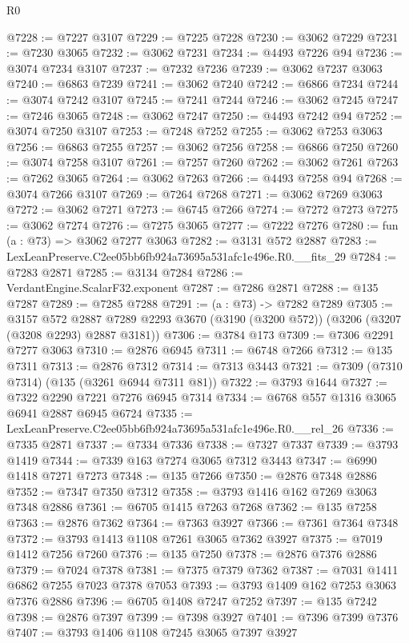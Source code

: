 \begin{lexlean}{R0}
\begin{coremodule}
@7228 := @7227 @3107
@7229 := @7225 @7228
@7230 := @3062 @7229
@7231 := @7230 @3065
@7232 := @3062 @7231
@7234 := @4493 @7226 @94
@7236 := @3074 @7234 @3107
@7237 := @7232 @7236
@7239 := @3062 @7237 @3063
@7240 := @6863 @7239
@7241 := @3062 @7240
@7242 := @6866 @7234
@7244 := @3074 @7242 @3107
@7245 := @7241 @7244
@7246 := @3062 @7245
@7247 := @7246 @3065
@7248 := @3062 @7247
@7250 := @4493 @7242 @94
@7252 := @3074 @7250 @3107
@7253 := @7248 @7252
@7255 := @3062 @7253 @3063
@7256 := @6863 @7255
@7257 := @3062 @7256
@7258 := @6866 @7250
@7260 := @3074 @7258 @3107
@7261 := @7257 @7260
@7262 := @3062 @7261
@7263 := @7262 @3065
@7264 := @3062 @7263
@7266 := @4493 @7258 @94
@7268 := @3074 @7266 @3107
@7269 := @7264 @7268
@7271 := @3062 @7269 @3063
@7272 := @3062 @7271
@7273 := @6745 @7266
@7274 := @7272 @7273
@7275 := @3062 @7274
@7276 := @7275 @3065
@7277 := @7222 @7276
@7280 := fun (a : @73) => @3062 @7277 @3063
@7282 := @3131 @572 @2887
@7283 := LexLeanPreserve.C2ee05bb6fb924a73695a531afc1e496e.R0.__fits_29
@7284 := @7283 @2871
@7285 := @3134 @7284
@7286 := VerdantEngine.ScalarF32.exponent
@7287 := @7286 @2871
@7288 := @135 @7287
@7289 := @7285 @7288
@7291 := (a : @73) -> @7282 @7289
@7305 := @3157
    @572
    @2887
    @7289
    @2293
    @3670
    (@3190 (@3200 @572))
    (@3206 (@3207 (@3208 @2293) @2887 @3181))
@7306 := @3784 @173
@7309 := @7306 @2291 @7277 @3063
@7310 := @2876 @6945
@7311 := @6748 @7266
@7312 := @135 @7311
@7313 := @2876 @7312
@7314 := @7313 @3443
@7321 := @7309 (@7310 @7314) (@135 (@3261 @6944 @7311 @81))
@7322 := @3793 @1644
@7327 := @7322 @2290 @7221 @7276 @6945 @7314
@7334 := @6768 @557 @1316 @3065 @6941 @2887 @6945 @6724
@7335 := LexLeanPreserve.C2ee05bb6fb924a73695a531afc1e496e.R0.__rel_26
@7336 := @7335 @2871
@7337 := @7334 @7336
@7338 := @7327 @7337
@7339 := @3793 @1419
@7344 := @7339 @163 @7274 @3065 @7312 @3443
@7347 := @6990 @1418 @7271 @7273
@7348 := @135 @7266
@7350 := @2876 @7348 @2886
@7352 := @7347 @7350 @7312
@7358 := @3793 @1416 @162 @7269 @3063 @7348 @2886
@7361 := @6705 @1415 @7263 @7268
@7362 := @135 @7258
@7363 := @2876 @7362
@7364 := @7363 @3927
@7366 := @7361 @7364 @7348
@7372 := @3793 @1413 @1108 @7261 @3065 @7362 @3927
@7375 := @7019 @1412 @7256 @7260
@7376 := @135 @7250
@7378 := @2876 @7376 @2886
@7379 := @7024 @7378
@7381 := @7375 @7379 @7362
@7387 := @7031 @1411 @6862 @7255 @7023 @7378 @7053
@7393 := @3793 @1409 @162 @7253 @3063 @7376 @2886
@7396 := @6705 @1408 @7247 @7252
@7397 := @135 @7242
@7398 := @2876 @7397
@7399 := @7398 @3927
@7401 := @7396 @7399 @7376
@7407 := @3793 @1406 @1108 @7245 @3065 @7397 @3927

\end{coremodule}
\end{lexlean}
